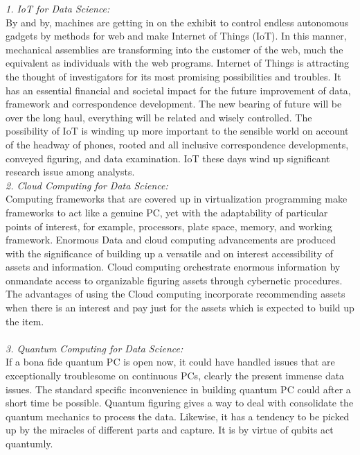 \documentclass[a4paper]{article}
\begin{document}
\begin{multicols}{2}
\textit{1. IoT for Data Science:\\}
By and by, machines are getting in on the exhibit to control
endless autonomous gadgets by methods for web and make
Internet of Things (IoT). In this manner, mechanical
assemblies are transforming into the customer of the web,
much the equivalent as individuals with the web programs.
Internet of Things is attracting the thought of investigators for
its most promising possibilities and troubles. It has an essential
financial and societal impact for the future improvement of
data, framework and correspondence development. The new
bearing of future will be over the long haul, everything will be
related and wisely controlled. The possibility of IoT is winding
up more important to the sensible world on account of the
headway of phones, rooted and all inclusive correspondence
developments, conveyed figuring, and data examination. IoT
these days wind up significant research issue among analysts. \\

\textit{2. Cloud Computing for Data Science:\\}
Computing frameworks that are covered up in virtualization
programming make frameworks to act like a genuine PC, yet
with the adaptability of particular points of interest, for
example, processors, plate space, memory, and working
framework. Enormous Data and cloud computing
advancements are produced with the significance of building
up a versatile and on interest accessibility of assets and
information. Cloud computing orchestrate enormous
information by onmandate access to organizable figuring
assets through cybernetic procedures. The advantages of using
the Cloud computing incorporate recommending assets when
there is an interest and pay just for the assets which is expected
to build up the item. \\ \\
\textit{3. Quantum Computing for Data Science:\\}
If a bona fide quantum PC is open now, it could have handled
issues that are exceptionally troublesome on continuous PCs,
clearly the present immense data issues. The standard specific
inconvenience in building quantum PC could after a short time
be possible. Quantum figuring gives a way to deal with
consolidate the quantum mechanics to process the data.
Likewise, it has a tendency to be picked up by the miracles of
different parts and capture. It is by virtue of qubits act quantumly.


\end{multicols}
\end{document}
